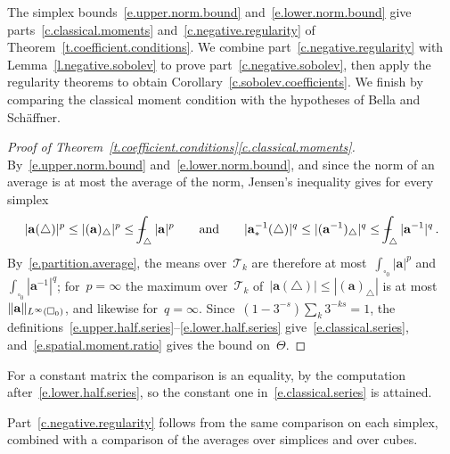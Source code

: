\documentclass[11pt,letterpaper]{article}
\numberwithin{equation}{section}
\theoremstyle{definition}
\renewcommand{\a}{\mathbf{a}}
\newcommand{\cu}{\square}
\DeclarePairedDelimiter{\norm}{\lVert}{\rVert}
\def\Xint#1{\mathchoice
	{\XXint\displaystyle\textstyle{#1}}%
	{\XXint\textstyle\scriptstyle{#1}}%
	{\XXint\scriptstyle\scriptscriptstyle{#1}}%
	{\XXint\scriptscriptstyle\scriptscriptstyle{#1}}%
	\!\int}
\def\XXint#1#2#3{{\setbox0=\hbox{$#1{#2#3}{\int}$}
		\vcenter{\hbox{$#2#3$}}\kern-.5\wd0}}
\def\fint{\Xint-}
\begin{document}
The simplex bounds~\eqref{e.upper.norm.bound} and~\eqref{e.lower.norm.bound} give parts~\ref{c.classical.moments} and~\ref{c.negative.regularity} of Theorem~\ref{t.coefficient.conditions}. We combine part~\ref{c.negative.regularity} with Lemma~\ref{l.negative.sobolev} to prove part~\ref{c.negative.sobolev}, then apply the regularity theorems to obtain Corollary~\ref{c.sobolev.coefficients}. We finish by comparing the classical moment condition with the hypotheses of Bella and Sch\"affner.

\begin{proof}[Proof of Theorem~\ref{t.coefficient.conditions}\ref{c.classical.moments}]
By~\eqref{e.upper.norm.bound} and~\eqref{e.lower.norm.bound}, and since the norm of an average is at most the average of the norm, Jensen's inequality gives for every simplex
\begin{equation*}
	|\a(\triangle)|^p\leq|(\a)_\triangle|^p\leq\fint_\triangle|\a|^p\qquad\mbox{and}\qquad |\a_*^{-1}(\triangle)|^q\leq|(\a^{-1})_\triangle|^q\leq\fint_\triangle|\a^{-1}|^q\,.
\end{equation*}
By~\eqref{e.partition.average}, the means over~$\mathscr T_k$ are therefore at most~$\int_{\cu_0}|\a|^p$ and~$\int_{\cu_0}|\a^{-1}|^q$; for~$p=\infty$ the maximum over~$\mathscr T_k$ of~$|\a(\triangle)|\leq|(\a)_\triangle|$ is at most~$\norm{\a}_{L^\infty(\cu_0)}$, and likewise for~$q=\infty$. Since~$(1-3^{-s})\sum_k3^{-ks}=1$, the definitions~\eqref{e.upper.half.series}--\eqref{e.lower.half.series} give~\eqref{e.classical.series}, and~\eqref{e.spatial.moment.ratio} gives the bound on~$\Theta$.
\end{proof}

For a constant matrix the comparison is an equality, by the computation after~\eqref{e.lower.half.series}, so the constant one in~\eqref{e.classical.series} is attained.

\smallskip

Part~\ref{c.negative.regularity} follows from the same comparison on each simplex, combined with a comparison of the averages over simplices and over cubes.
\end{document}
